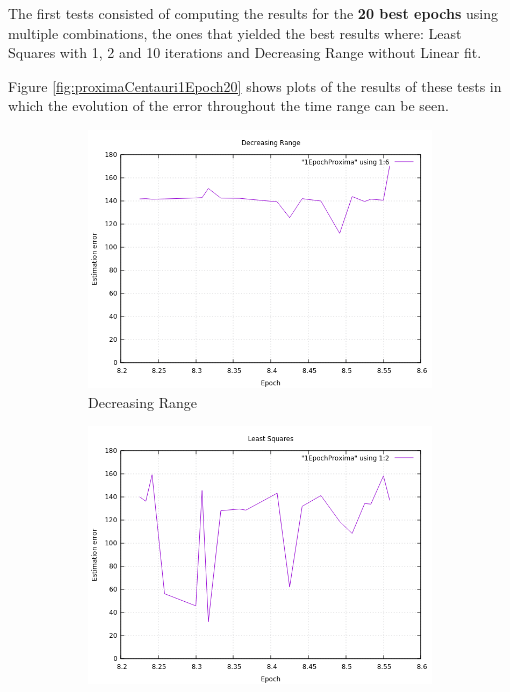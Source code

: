 The first tests consisted of computing the results for the \textbf{20 best epochs} using multiple combinations, the ones that yielded the best results where: Least Squares with 1, 2 and 10 iterations and Decreasing Range without Linear fit. 

Figure \ref{fig:proximaCentauri1Epoch20} shows plots of the results of these tests in which the evolution of the error throughout the time range can be seen.

\begin{figure}[!htb]
	\begin{subfigure}[b]{0.5\textwidth}
		\includegraphics[width=\linewidth]{images/resultsStellar/20Epochs1Epoch/1EpochProximaDR.png}
		\caption{Decreasing Range}
	\end{subfigure}
	\hfill
	\begin{subfigure}[b]{0.5\textwidth}
		\includegraphics[width=\linewidth]{images/resultsStellar/20Epochs1Epoch/1EpochProximaLS1.png}

\end{subfigure}
\end{figure}

